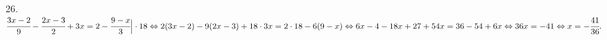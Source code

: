 26. $\cfrac{3x-2}{9}-\cfrac{2x-3}{2}+3x=2-\cfrac{9-x}{3}\Big|\cdot18\Leftrightarrow
2(3x-2)-9(2x-3)+18\cdot3x=2\cdot18-6(9-x)\Leftrightarrow
6x-4-18x+27+54x=36-54+6x\Leftrightarrow
36x=-41\Leftrightarrow x=-\cfrac{41}{36}.$\\
